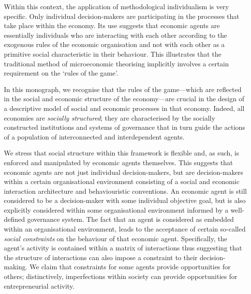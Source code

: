 Within this context, the application of methodological individualism is very specific. Only individual decision-makers are participating in the processes that take place within the economy. Its use suggests that economic agents are essentially individuals who are interacting with each other according to the exogenous rules of the economic organisation and not with each other as a primitive social characteristic in their behaviour. This illustrates that the traditional method of microeconomic theorising implicitly involves a certain requirement on the `rules of the game'.

\medskip \noindent In this monograph, we recognise that the rules of the game---which are reflected in the social and economic structure of the economy---are crucial in the design of a descriptive model of social and economic processes in that economy. Indeed, all economies are \emph{socially structured}; they are characterised by the socially constructed institutions and systems of governance that in turn guide the actions of a population of interconnected and interdependent agents.

We stress that social structure within this framework is flexible and, as such, is enforced and manipulated by economic agents themselves. This suggests that economic agents are not just individual decision-makers, but are decision-makers within a certain organisational environment consisting of a social and economic interaction architecture and behaviouristic conventions. An economic agent is still considered to be a decision-maker with some individual objective goal, but is also explicitly considered within some organisational environment informed by a well-defined governance system. The fact that an agent is considered as embedded within an organisational environment, leads to the acceptance of certain so-called \emph{social constraints} on the behaviour of that economic agent. Specifically, the agent's activity is contained within a matrix of interactions thus suggesting that the structure of interactions can also impose a constraint to their decision-making. We claim that constraints for some agents provide opportunities for others; distinctively, imperfections within society can provide opportunities for entrepreneurial activity.

